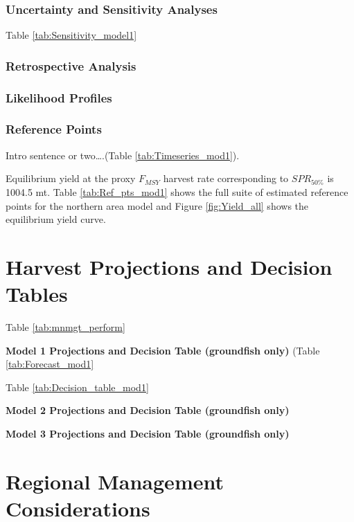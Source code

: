 \documentclass[12pt,]{article}
\begin{document}
\subsubsection{Uncertainty and Sensitivity
Analyses}\label{uncertainty-and-sensitivity-analyses}

Table \ref{tab:Sensitivity_model1}

\subsubsection{Retrospective Analysis}\label{retrospective-analysis}

\subsubsection{Likelihood Profiles}\label{likelihood-profiles}

\subsubsection{Reference Points}\label{reference-points-1}

Intro sentence or two\ldots{}.(Table \ref{tab:Timeseries_mod1}).

Equilibrium yield at the proxy \(F_{MSY}\) harvest rate corresponding to
\(SPR_{50\%}\) is 1004.5 mt. Table \ref{tab:Ref_pts_mod1} shows the full
suite of estimated reference points for the northern area model and
Figure \ref{fig:Yield_all} shows the equilibrium yield curve.

\section{Harvest Projections and Decision
Tables}\label{harvest-projections-and-decision-tables}

Table \ref{tab:mnmgt_perform}

\textbf{Model 1 Projections and Decision Table (groundfish only)} (Table
\ref{tab:Forecast_mod1}

Table \ref{tab:Decision_table_mod1}

\textbf{Model 2 Projections and Decision Table (groundfish only)}

\textbf{Model 3 Projections and Decision Table (groundfish only)}

\section{Regional Management
Considerations}\label{regional-management-considerations}
\end{document}
